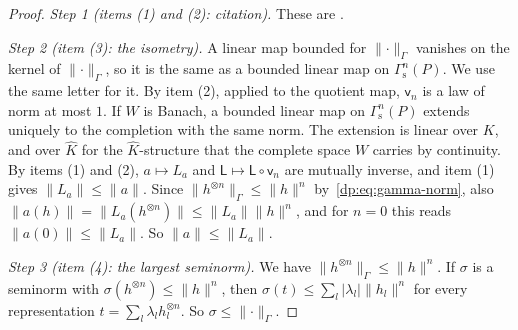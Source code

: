 \documentclass[11pt]{amsart}
\theoremstyle{definition}
\theoremstyle{remark}
\numberwithin{equation}{section}
\newcommand{\abs}[1]{\lvert #1\rvert}
\newcommand{\norm}[1]{\lVert #1\rVert}
\newcommand{\Kh}{\widehat K}
\theoremstyle{plain}
\theoremstyle{definition}
\theoremstyle{plain}
\begin{document}
\begin{proof}
\emph{Step 1 (items (1) and (2): citation).} These are \cite[Lemma~Q.1(1),(2)]{I}.

\emph{Step 2 (item (3): the isometry).} A linear map bounded for $\norm\cdot_\Gamma$ vanishes on the kernel of $\norm\cdot_\Gamma$, so it is the same as a bounded linear map on $\Gamma^n_{\mathrm s}(P)$. We use the same letter for it. By item (2), applied to the quotient map, $\mathsf v_n$ is a law of norm at most $1$. If $W$ is Banach, a bounded linear map on $\Gamma^n_{\mathrm s}(P)$ extends uniquely to the completion with the same norm. The extension is linear over $K$, and over $\Kh$ for the $\Kh$\nobreakdash-structure that the complete space $W$ carries by continuity. By items (1) and (2), $a\mapsto L_a$ and $\mathsf L\mapsto\mathsf L\circ\mathsf v_n$ are mutually inverse, and item (1) gives $\norm{L_a}\le\norm a$. Since $\norm{h^{\otimes n}}_\Gamma\le\norm h^n$ by~\eqref{dp:eq:gamma-norm}, also $\norm{a(h)}=\norm{L_a(h^{\otimes n})}\le\norm{L_a}\norm h^n$, and for $n=0$ this reads $\norm{a(0)}\le\norm{L_a}$. So $\norm a\le\norm{L_a}$.

\emph{Step 3 (item (4): the largest seminorm).} We have $\norm{h^{\otimes n}}_\Gamma\le\norm h^n$. If $\sigma$ is a seminorm with $\sigma(h^{\otimes n})\le\norm h^n$, then $\sigma(t)\le\sum_l\abs{\lambda_l}\norm{h_l}^n$ for every representation $t=\sum_l\lambda_lh_l^{\otimes n}$. So $\sigma\le\norm\cdot_\Gamma$.
\end{proof}
\end{document}
